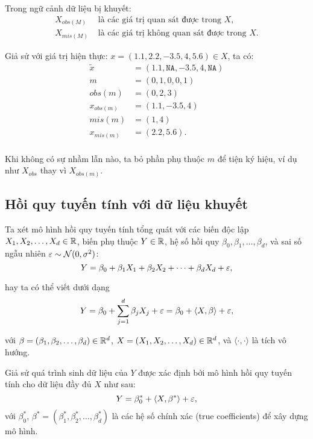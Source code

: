 Trong ngữ cảnh dữ liệu bị khuyết:
\begin{align*}
    X_{obs(M)} &\text{ là các giá trị quan sát được trong } X, \\
    X_{mis(M)} &\text{ là các giá trị không quan sát được trong } X.
\end{align*}


\begin{example}
Giả sử với giá trị hiện thực: $x = (1.1, 2.2, -3.5, 4, 5.6) \in X$, ta có:
\[
    \begin{split}
        \widetilde{x} &= (1.1, \texttt{NA}, -3.5, 4, \texttt{NA}) \\
        m &= (0, 1, 0, 0, 1) \\
        obs(m) &= (0, 2, 3) \\
        x_{obs(m)} &= (1.1, -3.5, 4) \\
        mis(m) &= (1, 4) \\
        x_{mis(m)} &= (2.2, 5.6). \\
    \end{split}
\]
\end{example}
Khi không có sự nhầm lẫn nào, ta bỏ phần phụ thuộc $m$ để tiện ký hiệu, 
ví dụ như $X_{obs}$ thay vì $X_{obs(m)}$.

\subsection{Hồi quy tuyến tính với dữ liệu khuyết}
Ta xét mô hình hồi quy tuyến tính tổng quát với các biến độc lập $X_1, X_2, \dots, X_d \in \mathbb R$, biến phụ thuộc $Y \in \mathbb R$, hệ số hồi quy $\beta_0, \beta_1, \dots, \beta_d$, và sai số ngẫu nhiên $\varepsilon \sim \mathcal{N}(0, \sigma^2)$:
\begin{equation*}
    Y = \beta_0 + \beta_1 X_1  + \beta_2 X_2 + \dots + \beta_d X_d + \varepsilon,
\end{equation*}

hay ta có thể viết dưới dạng 
\begin{equation*}
    Y = \beta_0 +  \sum_{j=1}^d \beta_j X_j + \varepsilon = \beta_0 + \langle X, \beta \rangle + \varepsilon,
\end{equation*}

với 
$\beta = (\beta_1, \beta_2, \dots, \beta_d) \in \mathbb R^d$, $X = (X_1, X_2, \dots, X_d) \in \mathbb R^d$, và $\langle \cdot, \cdot \rangle$ là tích vô hướng.


Giả sử quá trình sinh dữ liệu của $Y$ được xác định bởi mô hình hồi quy tuyến tính cho dữ liệu đầy đủ $X$ như sau:
\begin{equation}\label{eq:lr_matrix_notation}
    Y 
    = \beta_0^* + \langle X, \beta^* \rangle + \varepsilon,
\end{equation}
với $\beta_0^*$, $\beta^* = (\beta_1^*, \beta_2^*, \dots, \beta_d^*)$ là các hệ số chính xác (true coefficients) để xây dựng mô hình.

